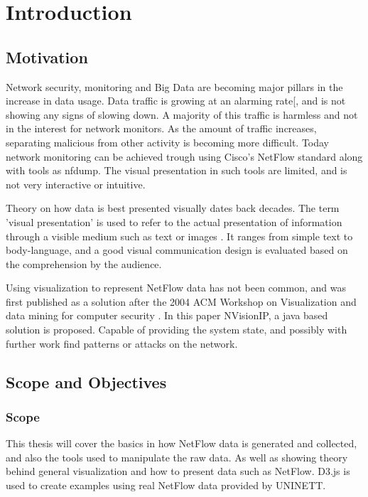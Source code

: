 \chapter{Introduction}
\label{chp:introduction}

\section{Motivation}
Network security, monitoring and Big Data are becoming major pillars in the increase in data usage. Data traffic is growing at an alarming rate[\citep{datatraffic}, and is not showing any signs of slowing down. A majority of this traffic is harmless and not in the interest for network monitors. As the amount of traffic increases, separating malicious from other activity is becoming more difficult. Today network monitoring can be achieved trough using Cisco's NetFlow standard along with tools as nfdump. The visual presentation in such tools are limited, and is not very interactive or intuitive. 

Theory on how data is best presented visually dates back decades. The term 'visual presentation' is used to refer to the actual presentation of information through a visible medium such as text or images \cite{2007visual}. It ranges from simple text to body-language, and a good visual communication design is evaluated based on the comprehension by the audience. 

Using visualization to represent NetFlow data has not been common, and was first published as a solution after the 2004 ACM Workshop on Visualization and data mining for computer security \citep{nvisionip}. In this paper NVisionIP, a java based solution is proposed. Capable of providing the system state, and possibly with further work find patterns or attacks on the network. 

\section{Scope and Objectives}
\subsection{Scope}
This thesis will cover the basics in how NetFlow data is generated and collected, and also the tools used to manipulate the raw data. As well as showing theory behind general visualization and how to present data such as NetFlow. D3.js is used to create examples using real NetFlow data provided by UNINETT. 

